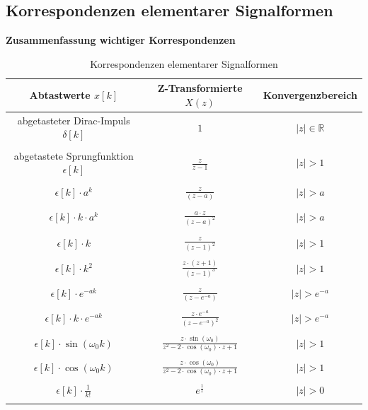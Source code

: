 \addvspace{1cm}
\subsection{Korrespondenzen elementarer Signalformen}

\textbf{Zusammenfassung wichtiger Korrespondenzen}

\begin{table}[H]
    \centering
    
    \begin{tabular}{|c|c|c|}
        \hline
        Abtastwerte $x[k]$ & Z-Transformierte $X(z)$ & Konvergenzbereich \rule{0pt}{0.5cm} \\
        \hline 
        abgetasteter Dirac-Impuls $\delta[k]$ & $1$ & $|z| \in \mathbb{R}$\rule{0pt}{0.5cm} \\
        & & \\
        \hline
        abgetastete Sprungfunktion $\epsilon[k]$ & $\frac{z}{z-1}$ & $|z| > 1$\rule{0pt}{0.5cm} \\
             & & \\
        \hline
        $\epsilon[k] \cdot a^k$ & $\frac{z}{(z-a)}$ & $|z| > a$\rule{0pt}{0.5cm} \\
             & & \\
        \hline
        $\epsilon[k] \cdot k \cdot a^k$ & $\frac{a \cdot z}{(z-a)^2}$ & $|z| > a$\rule{0pt}{0.5cm} \\
             & & \\
        \hline
        $\epsilon[k] \cdot k$ & $\frac{z}{(z-1)^2}$ & $|z| > 1$\rule{0pt}{0.5cm} \\
             & & \\
        \hline
        $\epsilon[k] \cdot k^2$ & $\frac{z\cdot (z+1)}{(z-1)^3}$ & $|z| > 1$\rule{0pt}{0.5cm} \\ 
             & & \\
        \hline
        $\epsilon[k] \cdot e^{-ak}$ & $\frac{z}{(z-e^{-a})}$ & $|z| > e^{-a}$\rule{0pt}{0.5cm} \\
             & & \\
        \hline
        $\epsilon[k] \cdot k \cdot e^{-ak}$ & $\frac{z\cdot e^{-a}}{\left(z-e^{-a}\right)^2}$ & $|z| > e^{-a}$\rule{0pt}{0.5cm} \\
             & & \\
        \hline
        $\epsilon[k]\cdot \sin(\omega_0 k)$ & $\frac{z\cdot \sin(\omega_0)}{z^2 - 2\cdot \cos(\omega_0)\cdot z + 1}$ & $|z| > 1$ \rule{0pt}{0.5cm}\\
             & & \\
        \hline
        $\epsilon[k]\cdot \cos(\omega_0 k)$ & $\frac{z\cdot \cos(\omega_0)}{z^2 - 2\cdot \cos(\omega_0)\cdot z + 1}$ & $|z| > 1$ \rule{0pt}{0.5cm}\\
             & & \\
        \hline
        $\epsilon[k] \cdot \frac{1}{k!}$ & $e^{\frac{1}{z}}$ & $|z| > 0$\rule{0pt}{0.5cm} \\
             & & \\
        \hline
    \end{tabular}
    \caption{Korrespondenzen elementarer Signalformen\cite[S.218]{book4}}
    \label{tab:ZT_Korrespondenzen}
    

\end{table}
